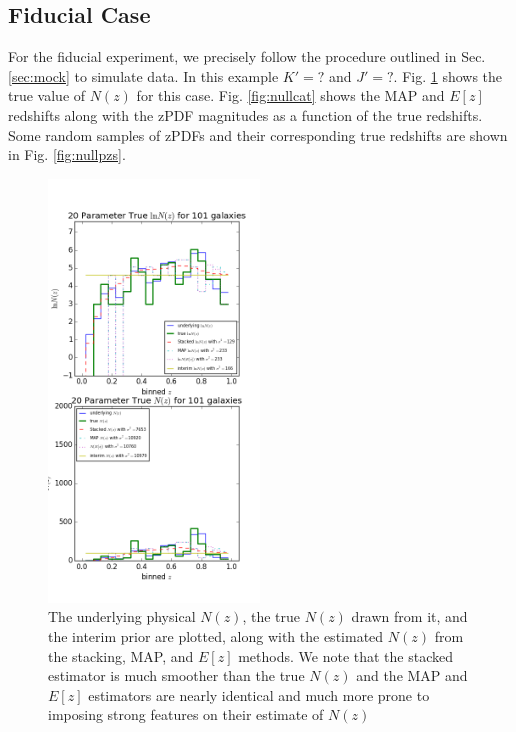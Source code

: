 \documentclass[preprint]{aastex}
\begin{document}
\clearpage
\subsection{Fiducial Case}
\label{sec:null}

For the fiducial experiment, we precisely follow the procedure outlined in Sec. \ref{sec:mock} to simulate data.  In this example $K'=?$ and $J'=?$.  Fig. \ref{fig:nulltrueNz} shows the true value of $N(z)$ for this case.  Fig. \ref{fig:nullcat} shows the MAP and $E[z]$ redshifts along with the zPDF magnitudes as a function of the true redshifts.  Some random samples of zPDFs and their corresponding true redshifts are shown in Fig. \ref{fig:nullpzs}.

\begin{figure}
\includegraphics[width=0.5\textwidth]{null/trueNz.png}
\caption{The underlying physical $N(z)$, the true $N(z)$ drawn from it, and the interim prior are plotted, along with the estimated $N(z)$ from the stacking, MAP, and $E[z]$ methods.  We note that the stacked estimator is much smoother than the true $N(z)$ and the MAP and $E[z]$ estimators are nearly identical and much more prone to imposing strong features on their estimate of $N(z)$}
\label{fig:nulltrueNz}
\end{figure}
\end{document}
